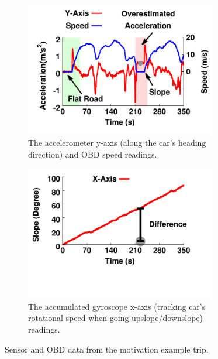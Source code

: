 \begin{figure}[!tbp] \centering
    \begin{subfigure}[b]{\linewidth}
         \includegraphics[width=3.3in,angle=0]{Figs/DriveSense/slopeaware/motivation.pdf}
         \vspace{-0.4cm}
         \caption{The accelerometer y-axis (along the car's heading direction) and OBD speed readings.}         
        \label{motivation:a}
    \end{subfigure} %

    \begin{subfigure}[b]{\linewidth}    
        \includegraphics[width=3.3in,angle=0]{Figs/DriveSense/slopeaware/gyro_motivation.pdf}
        \vspace{-1.5cm}
        \caption{The accumulated gyroscope x-axis (tracking car's rotational speed when going upslope/downslope) readings.}
        \label{motivation:b}    
    \end{subfigure} 
\caption{Sensor and OBD data from the motivation example trip.}
\label{motivation}
\vspace{-0.2cm}
\end{figure}



